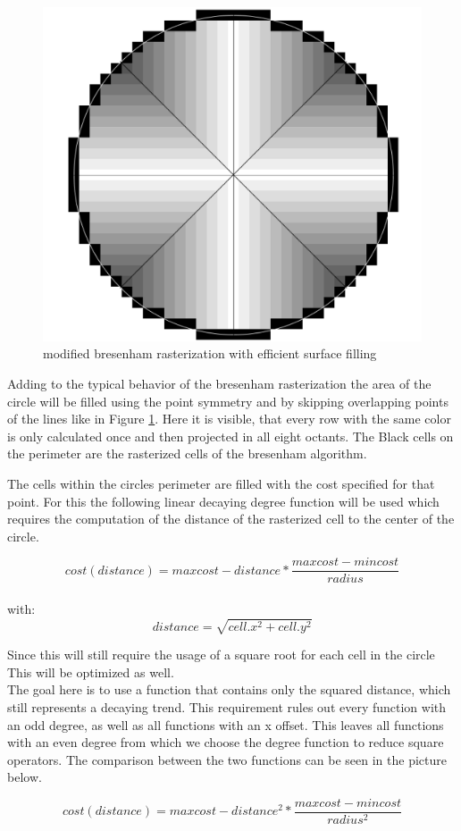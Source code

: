 \begin{figure}[H]
	\centering
	\includegraphics[width=.5\textwidth]{Pictures/rasterization}
	\caption{modified bresenham rasterization with efficient surface filling}
	\label{rasterization}
\end{figure}


Adding to the typical behavior of the bresenham rasterization the area of the circle will be filled using the point symmetry and by skipping overlapping points of the lines like in Figure \ref{rasterization}. Here it is visible, that every row with the same color is only calculated once and then projected in all eight octants. The Black cells on the perimeter are the rasterized cells of the bresenham algorithm.

The cells within the circles perimeter are filled with the cost specified for that point. For this the following linear decaying  degree function will be used which requires the computation of the distance of the rasterized cell to the center of the circle.

\[cost(distance)=maxcost-distance*\frac{maxcost-mincost}{radius}\]\\
with: \[distance=\sqrt{cell.x^2+cell.y^2}\]

 Since this will still require the usage of a square root for each cell in the circle This will be optimized as well.\\

The goal here is to use a function that contains only the squared distance, which still represents a decaying trend. This requirement rules out every function with an odd degree, as well as all functions with an x offset. This leaves all functions with an even degree from which we choose the  degree function to reduce square operators. The comparison between the two functions can be seen in the picture below.

\[cost(distance)=maxcost-distance^2*\frac{maxcost-mincost}{radius^2}\]\\

